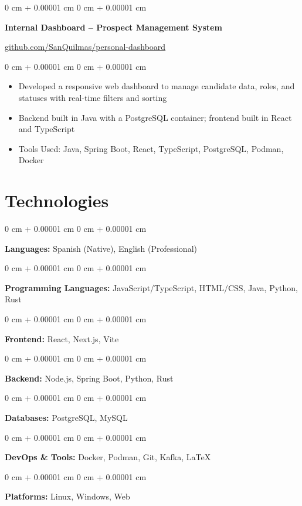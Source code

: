 \documentclass[10pt, letterpaper]{article}
\newenvironment{highlights}{
  \begin{itemize}[
        topsep=0.10 cm,
        parsep=0.10 cm,
        partopsep=0pt,
        itemsep=0pt,
        leftmargin=0 cm + 10pt
      ]
    }{
  \end{itemize}
} %
\newenvironment{onecolentry}{
  \begin{adjustwidth}{
      0 cm + 0.00001 cm
    }{
      0 cm + 0.00001 cm
    }
  }{
  \end{adjustwidth}
} %
\begin{document}
\vspace{0.2 cm}
\begin{onecolentry}
  \textbf{Internal Dashboard – Prospect Management System}
\end{onecolentry}
\vspace{0.05 cm}
\href{https://github.com/SanQuilmas/personal-dashboard}{github.com/SanQuilmas/personal-dashboard}
\vspace{0.10 cm}
\begin{onecolentry}
  \begin{highlights}
    \item Developed a responsive web dashboard to manage candidate data, roles, and statuses with real-time filters and sorting
    \item Backend built in Java with a PostgreSQL container; frontend built in React and TypeScript
    \item Tools Used: Java, Spring Boot, React, TypeScript, PostgreSQL, Podman, Docker
  \end{highlights}
\end{onecolentry}

\section{Technologies}

\begin{onecolentry}
  \textbf{Languages:} Spanish (Native), English (Professional)
\end{onecolentry}
\vspace{0.2 cm}

\begin{onecolentry}
  \textbf{Programming Languages:} JavaScript/TypeScript, HTML/CSS, Java, Python, Rust
\end{onecolentry}
\vspace{0.2 cm}

\begin{onecolentry}
  \textbf{Frontend:} React, Next.js, Vite
\end{onecolentry}
\vspace{0.2 cm}

\begin{onecolentry}
  \textbf{Backend:} Node.js, Spring Boot, Python, Rust
\end{onecolentry}
\vspace{0.2 cm}

\begin{onecolentry}
  \textbf{Databases:} PostgreSQL, MySQL
\end{onecolentry}
\vspace{0.2 cm}

\begin{onecolentry}
  \textbf{DevOps \& Tools:} Docker, Podman, Git, Kafka, LaTeX
\end{onecolentry}
\vspace{0.2 cm}

\begin{onecolentry}
  \textbf{Platforms:} Linux, Windows, Web
\end{onecolentry}
\end{document}
